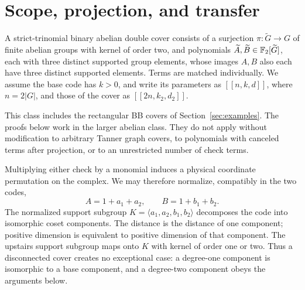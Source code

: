 \section{Scope, projection, and transfer}
\label{sec:homology}
\begin{definition}
A strict-trinomial binary abelian double cover consists of a surjection $\pi:\widetilde G\to G$ of finite abelian groups with kernel of order two, and polynomials $\widetilde A,\widetilde B\in\mathbb F_2[\widetilde G]$, each with three distinct supported group elements, whose images $A,B$ also each have three distinct supported elements. Terms are matched individually. We assume the base code has $k>0$, and write its parameters as $[[n,k,d]]$, where $n=2|G|$, and those of the cover as $[[2n,k_2,d_2]]$.
\end{definition}
This class includes the rectangular BB covers of Section~\ref{sec:examples}. The proofs below work in the larger abelian class. They do not apply without modification to arbitrary Tanner graph covers, to polynomials with canceled terms after projection, or to an unrestricted number of check terms.

Multiplying either check by a monomial induces a physical coordinate permutation on the complex. We may therefore normalize, compatibly in the two codes,
\begin{equation}\label{eq:normalized}
 A=1+a_1+a_2,\qquad B=1+b_1+b_2.
\end{equation}
The normalized support subgroup $K=\langle a_1,a_2,b_1,b_2\rangle$ decomposes the code into isomorphic coset components. The distance is the distance of one component; positive dimension is equivalent to positive dimension of that component. The upstairs support subgroup maps onto $K$ with kernel of order one or two. Thus a disconnected cover creates no exceptional case: a degree-one component is isomorphic to a base component, and a degree-two component obeys the arguments below.

